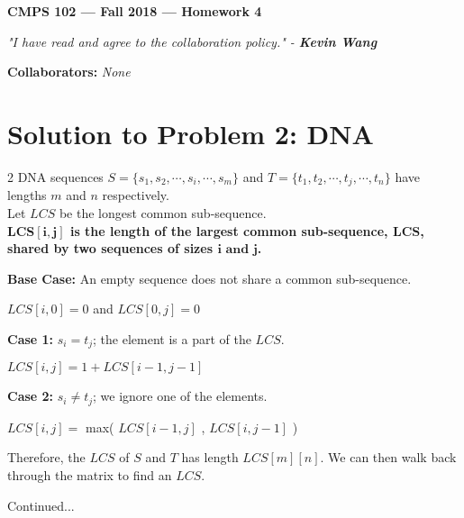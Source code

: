 \documentclass[11pt]{article}
\theoremstyle{definition}
\theoremstyle{plain}
\theoremstyle{indented-remark}
\theoremstyle{indented-proof}
\begin{document}
\begin{center}
{\bf\Large CMPS 102 --- Fall 2018 ---  Homework 4}
\end{center}

\begin{center}
\textit{"I have read and agree to the collaboration policy." - \textbf{Kevin Wang}}
\end{center}
\begin{center}
{\footnotesize \textbf{Collaborators:} \textit{None}} 
\end{center}

\section*{Solution to Problem 2: DNA}

2 DNA sequences $S=\{ s_{1} , s_{2} , \cdots , s_{i} , \cdots , s_{m} \}$ and $T=\{ t_{1} , t_{2} , \cdots , t_{j} , \cdots , t_{n} \}$ have lengths $m$ and $n$ respectively. \\

\noindent Let $LCS$ be the longest common sub-sequence. \\

\noindent \textbf{LCS$\boldsymbol{[i,j]}$ is the length of the largest common sub-sequence, $\boldsymbol{LCS}$, shared by two sequences of sizes $\boldsymbol{i \text{ and } j}$.} \newline

\indent \textbf{Base Case:} An empty sequence does not share a common sub-sequence.
\begin{center}
$LCS[i,0]=0$ and $LCS[0,j]=0$
\end{center}

\indent \textbf{Case 1:} $s_{i} = t_{j}$; the element is a part of the $LCS$.
\begin{center}
$LCS[i,j]=1+LCS[i-1,j-1]$
\end{center}

\indent \textbf{Case 2:} $s_{i} \neq t_{j}$; we ignore one of the elements.
\begin{center}
$LCS[i,j]=$ max( $LCS[i-1,j]$ , $LCS[i,j-1]$ )
\end{center}


\noindent Therefore, the $LCS$ of $S$ and $T$ has length $LCS[m][n]$. We can then walk back through the matrix to find an $LCS$.

\vfill

\begin{center}
Continued...
\end{center}
\end{document}

